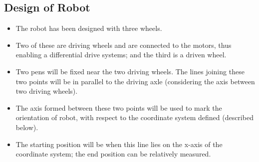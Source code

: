 \documentclass[10pt,a4paper]{article}
\begin{document}
	\subsection{Design of Robot}
		\begin{itemize}
			\item The robot has been designed with three wheels.
			\item Two of these are driving wheels and are connected to the motors, thus enabling a differential drive systems; and the third is a driven wheel.
			\item Two pens will be fixed near the two driving wheels. The lines joining these two points will be in parallel to the driving axle (considering the axis between two driving wheels).
			\item The axis formed between these two points will be used to mark the orientation of robot, with respect to the coordinate system defined (described below).
			\item The starting position will be when this line lies on the x-axis of the coordinate system; the end position can be relatively measured.
		\end{itemize}
	
\end{document}
